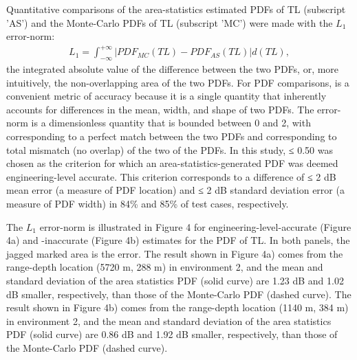 Quantitative comparisons of the area-statistics estimated PDFs of TL
(subscript 'AS') and the Monte-Carlo PDFs of TL (subscript 'MC') were
made with the $L_1$ error-norm:
\begin{align}
L_1=\int^{+\infty}_{-\infty}|PDF_{MC}(TL)-PDF_{AS}(TL)|d(TL),
\end{align}
the integrated absolute value of the difference between the two PDFs,
or, more intuitively, the non-overlapping area of the two PDFs.  For
PDF comparisons, is a convenient metric of accuracy because it is a
single quantity that inherently accounts for differences in the mean,
width, and shape of two PDFs. The error-norm is a dimensionless
quantity that is bounded between 0 and 2, with corresponding to a
perfect match between the two PDFs and corresponding to total mismatch
(no overlap) of the two of the PDFs. In this study, ≤ 0.50 was chosen
as the criterion for which an area-statistics-generated PDF was deemed
engineering-level accurate.  This criterion corresponds to a
difference of ≤ 2 dB mean error (a measure of PDF location) and ≤ 2 dB
standard deviation error (a measure of PDF width) in 84\% and 85\% of
test cases, respectively.

The $L_1$ error-norm is illustrated in Figure 4 for
engineering-level-accurate (Figure 4a) and -inaccurate (Figure 4b)
estimates for the PDF of TL. In both panels, the jagged marked area is
the error. The result shown in Figure 4a) comes from the range-depth
location (5720 m, 288 m) in environment 2, and the mean and standard
deviation of the area statistics PDF (solid curve) are 1.23 dB and
1.02 dB smaller, respectively, than those of the Monte-Carlo PDF
(dashed curve). The result shown in Figure 4b) comes from the
range-depth location (1140 m, 384 m) in environment 2, and the mean
and standard deviation of the area statistics PDF (solid curve) are
0.86 dB and 1.92 dB smaller, respectively, than those of the
Monte-Carlo PDF (dashed curve).

